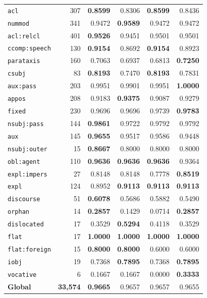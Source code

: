 \begin{table}[ht]
\begin{minipage}[t]{0.60\linewidth}
\begin{tabular}{l r  r r r r}
\texttt{acl} & 307 & \textbf{0.8599} & 0.8306 & \textbf{0.8599} & 0.8436 \\
\texttt{nummod} & 341 & 0.9472 & \textbf{0.9589} & 0.9472 & 0.9472 \\
\texttt{acl\!:\!relcl} & 401 & \textbf{0.9526} & 0.9451 & 0.9501 & 0.9501 \\
\texttt{ccomp\!:\!speech} & 130 & \textbf{0.9154} & 0.8692 & \textbf{0.9154} & 0.8923 \\
\texttt{parataxis} & 160 & 0.7063 & 0.6937 & 0.6813 & \textbf{0.7250} \\
\texttt{csubj} & 83 & \textbf{0.8193} & 0.7470 & \textbf{0.8193} & 0.7831 \\
\texttt{aux\!:\!pass} & 203 & 0.9951 & 0.9901 & 0.9951 & \textbf{1.0000} \\
\texttt{appos} & 208 & 0.9183 & \textbf{0.9375} & 0.9087 & 0.9279 \\
\texttt{fixed} & 230 & 0.9696 & 0.9696 & 0.9739 & \textbf{0.9783} \\
\texttt{nsubj\!:\!pass} & 144 & \textbf{0.9861} & 0.9722 & 0.9792 & 0.9792 \\
\texttt{aux} & 145 & \textbf{0.9655} & 0.9517 & 0.9586 & 0.9448 \\
\texttt{nsubj\!:\!outer} & 15 & \textbf{0.8667} & 0.8000 & 0.8000 & 0.8000 \\
\texttt{obl\!:\!agent} & 110 & \textbf{0.9636} & \textbf{0.9636} & \textbf{0.9636} & 0.9364 \\
\texttt{expl\!:\!impers} & 27 & 0.8148 & 0.8148 & 0.7778 & \textbf{0.8519} \\
\texttt{expl} & 124 & 0.8952 & \textbf{0.9113} & \textbf{0.9113} & \textbf{0.9113} \\
\texttt{discourse} & 51 & \textbf{0.6078} & 0.5686 & 0.5882 & 0.5490 \\
\texttt{orphan} & 14 & \textbf{0.2857} & 0.1429 & 0.0714 & \textbf{0.2857} \\
\texttt{dislocated} & 17 & 0.3529 & \textbf{0.5294} & 0.4118 & 0.3529 \\
\texttt{flat} & 17 & \textbf{1.0000} & \textbf{1.0000} & \textbf{1.0000} & \textbf{1.0000} \\
\texttt{flat\!:\!foreign} & 15 & \textbf{0.8000} & \textbf{0.8000} & 0.6000 & 0.6000 \\
\texttt{iobj} & 19 & 0.7368 & \textbf{0.7895} & 0.7368 & \textbf{0.7895} \\
\texttt{vocative} & 6 & 0.1667 & 0.1667 & 0.0000 & \textbf{0.3333} \\
\midrule
\textbf{Global} & \textbf{33,574} & \textbf{0.9665} & 0.9657 & 0.9657 & 0.9655 \\

\end{tabular}
\end{minipage}
\end{table}
